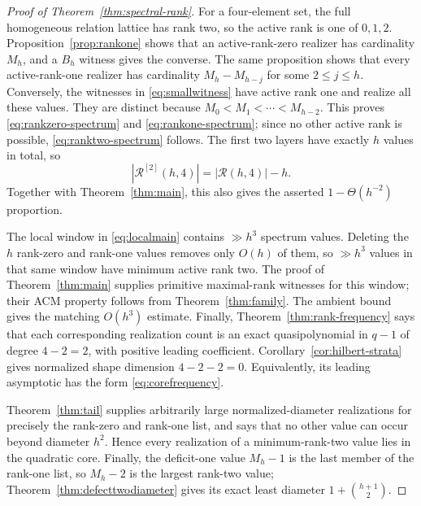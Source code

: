 \documentclass[11pt,reqno]{amsart}
\theoremstyle{definition}
\theoremstyle{remark}
\newcommand{\Rcal}{\mathcal R}
\begin{document}
\begin{proof}[Proof of Theorem~\ref{thm:spectral-rank}]
For a four-element set, the full homogeneous relation lattice has rank two,
so the active rank is one of $0,1,2$.  Proposition~\ref{prop:rankone} shows
that an active-rank-zero realizer has cardinality $M_h$, and a $B_h$ witness
gives the converse.  The same proposition shows that every active-rank-one
realizer has cardinality $M_h-M_{h-j}$ for some $2\leq j\leq h$.
Conversely, the witnesses in \eqref{eq:smallwitness} have active rank one and
realize all these values.  They are distinct because
$M_0<M_1<\cdots<M_{h-2}$.  This proves
\eqref{eq:rankzero-spectrum} and \eqref{eq:rankone-spectrum}; since no other
active rank is possible, \eqref{eq:ranktwo-spectrum} follows.
The first two layers have exactly $h$ values in total, so
\[
 |\Rcal^{[2]}(h,4)|=|\Rcal(h,4)|-h.
\]
Together with Theorem~\ref{thm:main}, this also gives the asserted
$1-\Theta(h^{-2})$ proportion.

The local window in \eqref{eq:localmain} contains $\gg h^3$ spectrum values.
Deleting the $h$ rank-zero and rank-one values removes only $O(h)$ of them,
so $\gg h^3$ values in that same window have minimum active rank two.  The
proof of Theorem~\ref{thm:main} supplies primitive maximal-rank witnesses for
this window; their ACM property follows from Theorem~\ref{thm:family}.  The
ambient bound gives the
matching $O(h^3)$ estimate.  Finally,
Theorem~\ref{thm:rank-frequency} says that each corresponding realization
count is an exact quasipolynomial in $q-1$ of degree $4-2=2$, with positive
leading coefficient.  Corollary~\ref{cor:hilbert-strata} gives normalized
shape dimension $4-2-2=0$.  Equivalently, its leading asymptotic has the form
\eqref{eq:corefrequency}.

Theorem~\ref{thm:tail} supplies arbitrarily large normalized-diameter
realizations for precisely the rank-zero and rank-one list, and says that no
other value can occur beyond diameter $h^2$.  Hence every realization of a
minimum-rank-two value lies in the quadratic core.  Finally, the deficit-one
value $M_h-1$ is the last member of the rank-one list, so $M_h-2$ is the
largest rank-two value; Theorem~\ref{thm:defecttwodiameter} gives its exact
least diameter $1+\binom{h+1}{2}$.
\end{proof}
\end{document}
